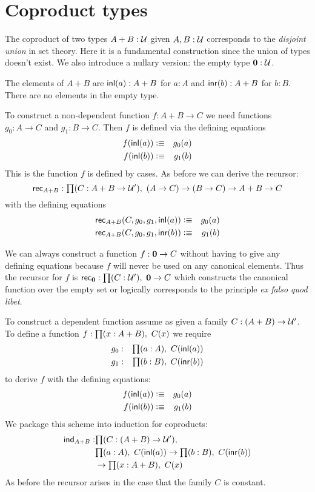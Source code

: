 \section{Coproduct types}
\label{sec:coproduct-types}

The coproduct of two types $A+B:\mathcal{U}$ given $A,B:\mathcal{U}$  corresponds to the \emph{disjoint
  union} in set theory. Here it is a fundamental construction
since the union of types doesn't exist. We also introduce a
nullary version: the empty type $\mathbf{0}:\mathcal{U}$.

The elements of $A+B$ are $\mathsf{inl}(a) : A+B$ for $a:A$ and
$\mathsf{inr}(b):A+B$ for $b:B$. There are no elements in the empty type. 

To construct a non-dependent function $f : A+B \to C$ we need 
functions $g_0 : A \to C$ and $g_1 : B \to C$. Then $f$ is defined
via the defining equations
\begin{eqnarray*}
  f(\mathsf{inl}(a)) & \vcentcolon\equiv & g_0(a) \\
  f(\mathsf{inl}(b)) & \vcentcolon\equiv & g_1(b) 
\end{eqnarray*}
This is the function $f$ is defined by cases. As before we can
derive the recursor:
\[ \rec{A+B} : \prd{C:A+B \to \UU'}(A \to C) \to (B\to C) \to A+B
\to C\]
with the defining equations
\begin{eqnarray*}
\mathsf{rec}_{A+B}(C,g_0,g_1,\mathsf{inl}(a)) & \vcentcolon\equiv & g_0(a) \\
\mathsf{rec}_{A+B}(C,g_0,g_1,\mathsf{inr}(b)) & \vcentcolon\equiv & g_1(b)
\end{eqnarray*}

We can always construct a function $f : \mathbf{0} \to C$ without
having to give any defining equations because $f$ will never be
used on any canonical elements. Thus the recursor for $f$ is
$\rec{\emptyt} : \prd{C:\UU'} \emptyt \to C$
which constructs the canonical function over the empty set or
logically corresponds to the principle \emph{ex falso quod libet}. 

To construct a dependent function assume as given a family 
$C: (A + B) \to \mathcal{U}'$. To define a function $f:\prd{x:A+B}C(x)$ we
require 
\begin{eqnarray*}
  g_0 & : & \prd{a:A} C(\inl(a)) \\
  g_1 & : & \prd{b:B} C(\inr(b))
\end{eqnarray*}
to derive $f$ with the defining equations:
\begin{eqnarray*}
  f(\mathsf{inl}(a)) & \vcentcolon\equiv & g_0(a) \\
  f(\mathsf{inl}(b)) & \vcentcolon\equiv & g_1(b) 
\end{eqnarray*}
We package this scheme into induction for coproducts:
\begin{align*}
 \ind{A+B} : & \prd{C: (A + B) \to \UU'}   \\
& \prd{a:A} C(\inl(a)) \to \prd{b:B} C(\inr(b))\\
& \to \prd{x:A+B}C(x) 
\end{align*}
As before the recursor arises in the case that the family $C$ is
constant. 

